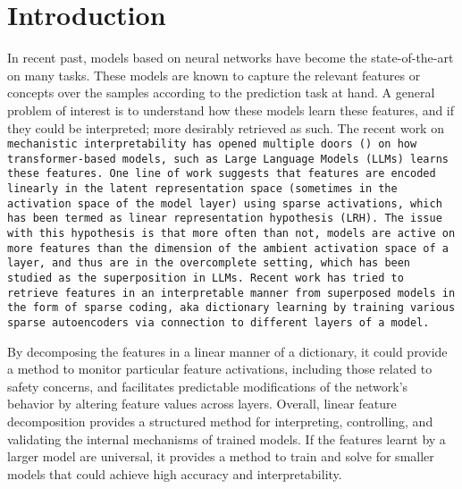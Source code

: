 \section{Introduction}
\iffalse
In recent past, models based on neural networks have become the state-of-the-art on many tasks. These models are known to capture the relevant features or concepts over the samples according to the prediction task at hand.  A general problem of interest is to understand how these models learn these features, and if they could be interpreted; more desirably retrieved as such. The recent work on \tt{mechanistic interpretability} has opened multiple doors () on how transformer-based models, such as Large Language Models (LLMs) learns these features. One line of work suggests that features are encoded linearly in the latent representation space (sometimes in the activation space of the model layer) using sparse activations, which has been termed as \tt{linear representation hypothesis} (LRH). The issue with this hypothesis is that more often than not, models are active on more features than the dimension of the ambient activation space of a layer, and thus are in the \tt{overcomplete} setting, which has been studied as the superposition in LLMs. Recent work has tried to retrieve features in an interpretable manner from superposed models in the form of sparse coding, aka dictionary learning by training various sparse autoencoders via connection to different layers of a model. 

By decomposing the features in a linear manner of a dictionary, it could provide a method to monitor particular feature activations, including those related to safety concerns, and facilitates predictable modifications of the network’s behavior by altering feature values across layers. Overall, linear feature decomposition provides a structured method for interpreting, controlling, and validating the internal mechanisms of trained models. If the features learnt by a larger model are universal, it provides a method to train and solve for smaller models that could achieve high accuracy and interpretability.



